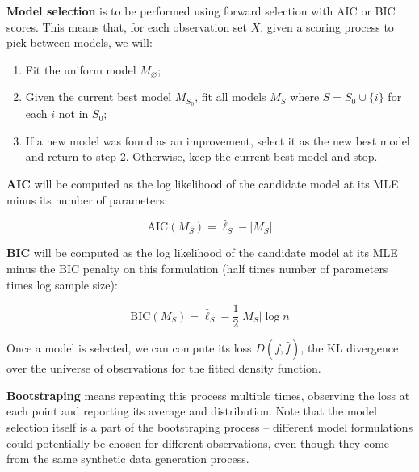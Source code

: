 \textbf{Model selection} is to be performed using forward selection with
AIC or BIC scores. This means that, for each observation set \(X\),
given a scoring process to pick between models, we will:

\begin{enumerate}[tightlist,label={\arabic*.}]
\item
  Fit the uniform model \(M_\varnothing\);
\item
  Given the current best model \(M_{S_{0}}\), fit all models \(M_{S}\)
  where \(S = S_{0} \cup \{ i \}\) for each \(i\) not in \(S_{0}\);
\item
  If a new model was found as an improvement, select it as the new best
  model and return to step 2. Otherwise, keep the current best model and
  stop.
\end{enumerate}

\textbf{AIC} will be computed as the log likelihood of the candidate
model at its MLE minus its number of parameters:

\[ \text{AIC}(M_S) = \hat{\ell}_S - |M_S| \]

\textbf{BIC} will be computed as the log likelihood of the candidate
model at its MLE minus the BIC penalty on this formulation (half times
number of parameters times log sample size):

\[ \text{BIC}(M_S) = \hat{\ell}_S - \frac{1}{2} |M_S| \log n \]

Once a model is selected, we can compute its loss \(D(f, \hat{f})\), the
KL divergence over the universe of observations for the fitted density
function.

\textbf{Bootstraping} means repeating this process multiple times,
observing the loss at each point and reporting its average and
distribution. Note that the model selection itself is a part of the
bootstraping process -- different model formulations could potentially
be chosen for different observations, even though they come from the
same synthetic data generation process.

